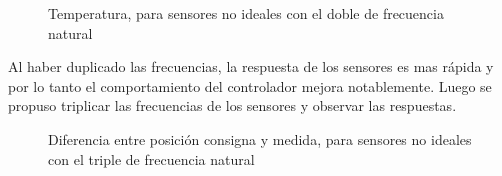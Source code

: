 \documentclass[a4paper, 10pt, onecolumn,journal]{ieeeconf}
\begin{document}
\begin{figure}[H]
	\centering
	\begin{adjustbox}{max width=\columnwidth}
	\end{adjustbox}
	\caption{Temperatura, para sensores no ideales con el doble de frecuencia natural}
	\label{Temperatura, para sensores no ideales con el doble de frecuencia natural}
\end{figure}

Al haber duplicado las frecuencias, la respuesta de los sensores es mas rápida y por lo tanto el comportamiento del controlador mejora notablemente. 
Luego se propuso triplicar las frecuencias de los sensores y observar las respuestas.

\begin{figure}[H]
	\centering
	\begin{adjustbox}{max width=\columnwidth}
	\end{adjustbox}
	\caption{Diferencia entre posición consigna y medida, para sensores no ideales con el triple de frecuencia natural}
	\label{Diferencia entre posición consignay medida, para sensores no ideales con el triple de frecuencia natural}
\end{figure}
\end{document}
